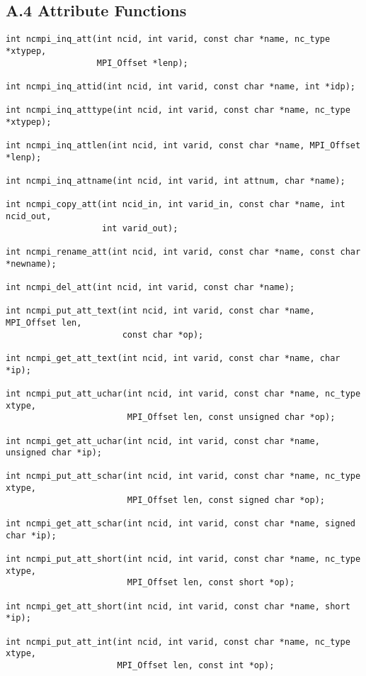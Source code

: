\documentclass[10pt]{article}
\begin{document}
\subsection*{A.4  Attribute Functions}

\begin{verbatim}
int ncmpi_inq_att(int ncid, int varid, const char *name, nc_type *xtypep,
                  MPI_Offset *lenp);

int ncmpi_inq_attid(int ncid, int varid, const char *name, int *idp);

int ncmpi_inq_atttype(int ncid, int varid, const char *name, nc_type *xtypep);

int ncmpi_inq_attlen(int ncid, int varid, const char *name, MPI_Offset *lenp);

int ncmpi_inq_attname(int ncid, int varid, int attnum, char *name);

int ncmpi_copy_att(int ncid_in, int varid_in, const char *name, int ncid_out,
                   int varid_out);

int ncmpi_rename_att(int ncid, int varid, const char *name, const char *newname);

int ncmpi_del_att(int ncid, int varid, const char *name);

int ncmpi_put_att_text(int ncid, int varid, const char *name, MPI_Offset len,
                       const char *op);

int ncmpi_get_att_text(int ncid, int varid, const char *name, char *ip);

int ncmpi_put_att_uchar(int ncid, int varid, const char *name, nc_type xtype,
                        MPI_Offset len, const unsigned char *op);

int ncmpi_get_att_uchar(int ncid, int varid, const char *name, unsigned char *ip);

int ncmpi_put_att_schar(int ncid, int varid, const char *name, nc_type xtype, 
                        MPI_Offset len, const signed char *op);

int ncmpi_get_att_schar(int ncid, int varid, const char *name, signed char *ip);

int ncmpi_put_att_short(int ncid, int varid, const char *name, nc_type xtype,
                        MPI_Offset len, const short *op);

int ncmpi_get_att_short(int ncid, int varid, const char *name, short *ip);

int ncmpi_put_att_int(int ncid, int varid, const char *name, nc_type xtype, 
                      MPI_Offset len, const int *op);


\end{verbatim}
\end{document}
